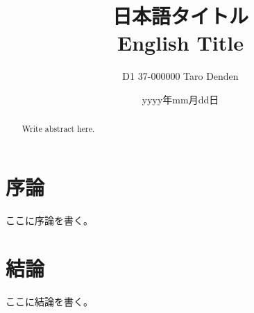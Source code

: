 \documentclass[10pt,a4paper,oneside,twocolumn,fleqn,dvipdfmx]{jsarticle}
\date{yyyy年mm月dd日}
\title{日本語タイトル\\ English Title}
\author{D1 37-000000 Taro Denden}
\affiliation{Laboratory Name\\Department of Electrical Engineering}
\makeatletter
\newcommand{\eeistitle}{
    \twocolumn[
        \centering{
            \framebox[\linewidth]{
                \parbox{\linewidth-2ex}{
                \@documentname\hfill\@date
                \begin{center}
                    \Large{\bf{\@title}}
                \end{center}
                \@affiliation \hfill \@author
                }
            }
        }
        \vskip 2ex
        \ifvoid\@abstractbox\else\centerline{\box\@abstractbox}
    ]
}
\makeatother
\begin{document}
\begin{abstract}
Write abstract here.
\end{abstract}

\eeistitle %
\thispagestyle{fancy}

\section{序論}
ここに序論を書く。

\section{結論}
ここに結論を書く。


\end{document}

